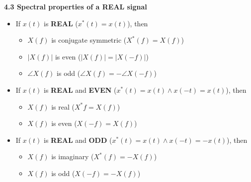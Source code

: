 \documentclass[landscape,a4paper]{extarticle}
\begin{document}
\begin{multicols*}{5}
    \textbf{4.3 Spectral properties of a REAL signal}
    \begin{itemize}
        \item If $x(t)$ is \textbf{REAL} ($x^*(t)=x(t)$), then
        \begin{itemize}
            \item $X(f)$ is conjugate symmetric \textcolor{black!70}{($X^*(f)=X(f)$)}
            \item $|X(f)|$ is even \textcolor{black!70}{($|X(f)|=|X(-f)|$)}
            \item $\angle X(f)$ is odd \textcolor{black!70}{($\angle X(f)=-\angle X(-f)$)}
        \end{itemize}
        \item If $x(t)$ is \textbf{REAL} and \textbf{EVEN} ($x^*(t)=x(t) \wedge x(-t)=x(t)$), then
        \begin{itemize}
            \item $X(f)$ is real \textcolor{black!70}{($X^*f=X(f)$)}
            \item $X(f)$ is even \textcolor{black!70}{($X(-f)=X(f)$)}
        \end{itemize}
        \item If $x(t)$ is \textbf{REAL} and \textbf{ODD} ($x^*(t)=x(t) \wedge x(-t)=-x(t)$), then
        \begin{itemize}
            \item $X(f)$ is imaginary \textcolor{black!70}{($X^*(f) = -X(f)$)}
            \item $X(f)$ is odd \textcolor{black!70}{($X(-f)=-X(f)$)}
        \end{itemize}
    \end{itemize}


\end{multicols*}
\end{document}
